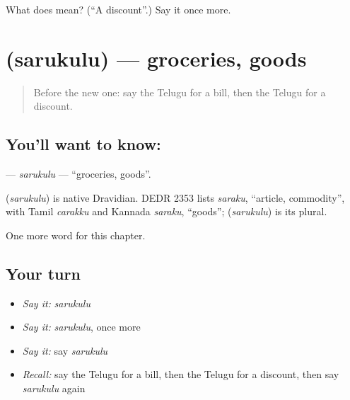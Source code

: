 \begin{tcolorbox}[breakable,colback=teal!4,colframe=teal!35!black,title={Before you move on}]
What does  mean? (\textquotedblleft{}A discount\textquotedblright{}.) Say it once more.
\end{tcolorbox}
\section[\texorpdfstring{\te{సరుకులు} (sarukulu)}{సరుకులు (sarukulu)}]{ (sarukulu) — groceries, goods}

\label{lesson:TE-C273-sarukulu}



\begin{quote}
Before the new one: say the Telugu for a bill, then the Telugu for a discount.
\end{quote}

\subsection*{You'll want to know: }
\textbf{} — \emph{sarukulu} — \textquotedblleft{}groceries, goods\textquotedblright{}.

\begin{cousinweb}
\textbf{} (\emph{sarukulu}) is native Dravidian. DEDR 2353 lists \emph{saraku}, \textquotedblleft{}article, commodity\textquotedblright{}, with Tamil \emph{carakku} and Kannada \emph{saraku}, \textquotedblleft{}goods\textquotedblright{}; \textbf{} (\emph{sarukulu}) is its plural.
\end{cousinweb}

\begin{grammarlens}[title={What you've built}]
One more word for this chapter.
\end{grammarlens}

\subsection*{Your turn}
\begin{itemize}
\raggedright
  \item \emph{Say it:} \emph{sarukulu}
  \item \emph{Say it:} \emph{sarukulu}, once more
  \item \emph{Say it:} say \emph{sarukulu}
  \item \emph{Recall:} say the Telugu for a bill, then the Telugu for a discount, then say \emph{sarukulu} again
\end{itemize}

